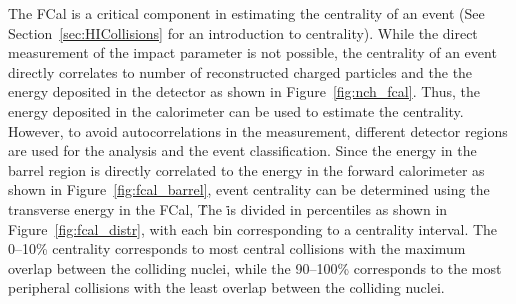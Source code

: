 The FCal is a critical component in estimating the centrality of an event (See Section~\ref{sec:HICollisions} for an introduction to centrality).
While the direct measurement of the impact parameter is not possible, the centrality of an event directly correlates to number of reconstructed charged particles and the the energy deposited in the detector as shown in Figure~\ref{fig:nch_fcal}.
Thus, the energy deposited in the calorimeter can be used to estimate the centrality.
However, to avoid autocorrelations in the measurement, different detector regions are used for the analysis and the event classification.
Since the energy in the barrel region is directly correlated to the energy in the forward calorimeter as shown in Figure~\ref{fig:fcal_barrel}, event centrality can be determined using the transverse energy in the FCal, \ETfcal\.
The \ETfcal\. is divided in percentiles as shown in Figure~\ref{fig:fcal_distr}, with each bin corresponding to a centrality interval.
The 0--10\% centrality corresponds to most central collisions with the maximum overlap between the colliding nuclei, while the 90--100\% corresponds to the most peripheral collisions with the least overlap between the colliding nuclei.



